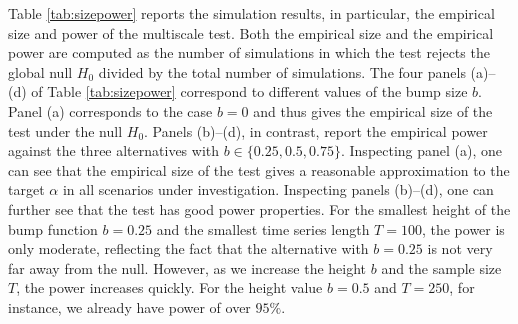 \documentclass[12pt]{article}
\begin{document}
Table \ref{tab:sizepower} reports the simulation results, in particular, the empirical size and power of the multiscale test. Both the empirical size and the empirical power are computed as the number of simulations in which the test rejects the global null $H_0$ divided by the total number of simulations.
The four panels (a)--(d) of Table \ref{tab:sizepower} correspond to different values of the bump size $b$. Panel (a) corresponds to the case $b=0$ and thus gives the empirical size of the test under the null $H_0$. Panels (b)--(d), in contrast, report the empirical power against the three alternatives with $b \in \{0.25,0.5,0.75\}$.
Inspecting panel (a), one can see that the empirical size of the test gives a reasonable approximation to the target $\alpha$ in all scenarios under investigation.
Inspecting panels (b)--(d), one can further see that the test has good power properties. For the smallest height of the bump function $b = 0.25$ and the smallest time series length $T = 100$, the power is only moderate, reflecting the fact that the alternative with $b = 0.25$ is not very far away from the null. However, as we increase the height $b$ and the sample size $T$, the power increases quickly. For the height value $b = 0.5$ and $T=250$, for instance, we already have power of over $95\%$.
\end{document}
